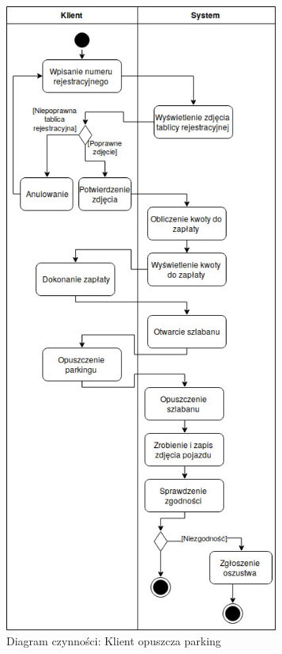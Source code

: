 \begin{figure}[H]
	\centering
	\includegraphics[width=90mm]{diagramy/DiagCzynWyjazd.jpg}
	\caption{Diagram czynności: Klient opuszcza parking \label{overflow}}
\end{figure}




